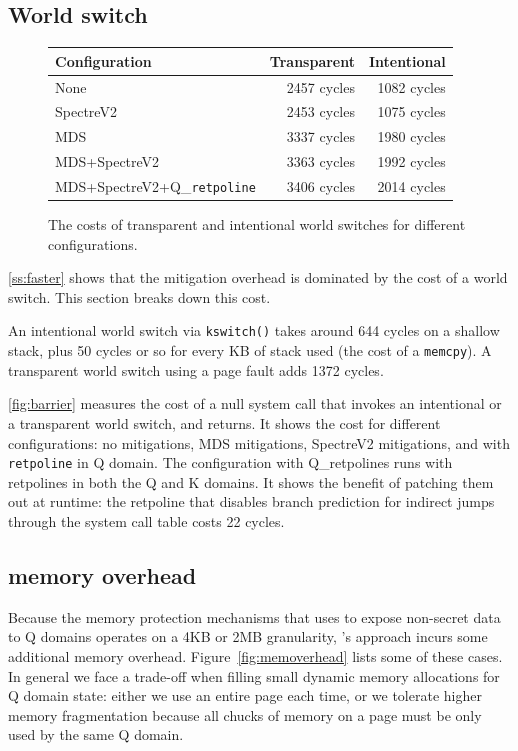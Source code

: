 \subsection*{World switch}
\label{ss:world}

\begin{figure}
\small
\centering
\begin{tabular}{lrr}
  {\bf Configuration}
  & {\bf Transparent} & {\bf Intentional} \\
\midrule
None & 2457 cycles & 1082 cycles \\
SpectreV2 & 2453 cycles & 1075 cycles \\
MDS & 3337 cycles & 1980 cycles \\
MDS+SpectreV2 & 3363 cycles & 1992 cycles \\
MDS+SpectreV2+Q\_\texttt{retpoline} & 3406 cycles & 2014 cycles \\
\end{tabular}
\caption{The costs of transparent and intentional world switches for
  different configurations.}
\label{fig:barrier}
\end{figure}

\autoref{ss:faster} shows that the mitigation overhead is dominated by
the cost of a world switch.  This section breaks down this cost.

An intentional world switch via \texttt{kswitch()} takes around 644
cycles on a shallow stack, plus 50 cycles or so for every KB of stack
used (the cost of a \texttt{memcpy}). A transparent world switch using a page
fault adds 1372 cycles.

\autoref{fig:barrier} measures the cost of a null system call that
invokes an intentional or a transparent world switch, and returns.  It
shows the cost for different configurations: no mitigations, MDS
mitigations, SpectreV2 mitigations, and with \texttt{retpoline} in Q
domain.  The configuration with Q\_retpolines runs with retpolines
in both the Q and K domains. It shows the benefit of \sys patching
them out at runtime: the retpoline that disables branch prediction
for indirect jumps through the system call table costs 22 cycles.


\subsection*{\sys memory overhead}
\label{ss:memoverhead}

Because the memory protection mechanisms that \sys uses to expose non-secret
data to Q domains operates on a 4KB or 2MB granularity, \sys's approach incurs
some additional memory overhead. Figure~\ref{fig:memoverhead} lists some of
these cases. In general we face a trade-off when filling small dynamic memory
allocations for Q domain state: either we use an entire page each time, or we
tolerate higher memory fragmentation because all chucks of memory on a page must
be only used by the same Q domain.

